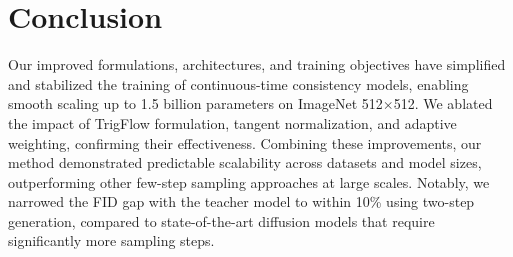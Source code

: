 \section{Conclusion}

Our improved formulations, architectures, and training objectives have simplified and stabilized the training of continuous-time consistency models, enabling smooth scaling up to 1.5 billion parameters on ImageNet 512$\times$512. We ablated the impact of TrigFlow formulation, tangent normalization, and adaptive weighting, confirming their effectiveness. Combining these improvements, our method demonstrated predictable scalability across datasets and model sizes, outperforming other few-step sampling approaches at large scales. Notably, we narrowed the FID gap with the teacher model to within 10\% using two-step generation, compared to state-of-the-art diffusion models that require significantly more sampling steps.




